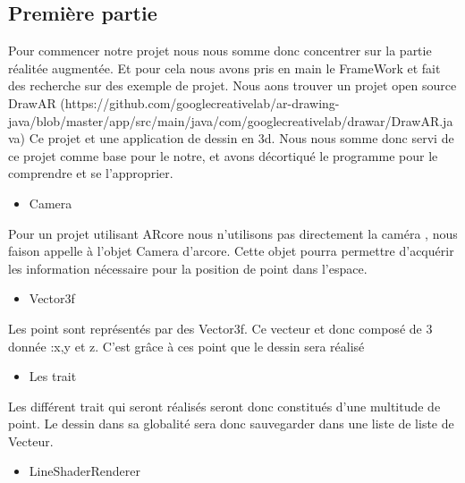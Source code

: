 \documentclass[12pt]{article}
\begin{document}
	\subsection{Première partie}
	\par
	Pour commencer notre projet nous nous somme donc concentrer sur la partie réalitée augmentée. Et pour cela nous avons pris en main le FrameWork et fait des recherche sur des exemple de projet. Nous aons trouver un projet open source DrawAR (https://github.com/googlecreativelab/ar-drawing-java/blob/master/app/src/main/java/com/googlecreativelab/drawar/DrawAR.java)  Ce projet et une application de dessin en 3d. Nous nous somme donc servi de ce projet comme base pour le notre, et avons décortiqué le programme pour le comprendre et se l'approprier. 
	\begin{itemize}
		\item Camera
	\end{itemize}
	\par
	Pour un projet utilisant ARcore nous n’utilisons pas directement la caméra , nous faison appelle à l’objet Camera d’arcore. Cette objet pourra permettre d'acquérir les information nécessaire pour la position de point dans l'espace.

	\begin{itemize}
		\item Vector3f
	\end{itemize}
	\par
	Les point sont représentés par des Vector3f. Ce vecteur et donc composé de 3 donnée :x,y et z. C’est grâce à ces point que le dessin sera réalisé

	\begin{itemize}
		\item Les trait
	\end{itemize}
	\par
	Les différent trait qui seront réalisés seront donc constitués d’une multitude de point. Le dessin dans sa globalité sera donc sauvegarder dans une liste de liste de Vecteur.

	\begin{itemize}
		\item LineShaderRenderer
	\end{itemize}
	
\end{document}
